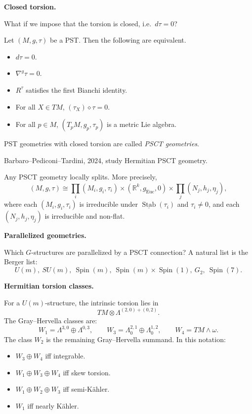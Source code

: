 \medskip\noindent
{\bf Closed torsion.}

What if we impose
that the torsion is closed,
i.e.\ $d\tau=0$?

\begin{lemma}
\label{lemma-let-m}
Let $(M,g,\tau)$ be a PST.
Then the following are equivalent.
\begin{itemize}
\item $d\tau=0$.
\item $\nabla^g\tau=0$.
\item $R^\tau$ satisfies the first
Bianchi identity.
\item For all $X\in TM$,
$(\tau_X)\diamond\tau=0$.
\item For all $p\in M$,
$(T_pM,g_p,\tau_p)$ is a
metric Lie algebra.
\end{itemize}
\end{lemma}

\begin{definition}
\label{definition-pst-geometries}
PST geometries with closed torsion are
called {\it PSCT geometries}.
\end{definition}

Barbaro--Pediconi--Tardini, 2024,
study Hermitian PSCT geometry.

\begin{theorem}
\label{theorem-any-psct}
Any PSCT geometry locally splits.
More precisely,
\[
(M,g,\tau)
\cong
\prod_i (M_i,g_i,\tau_i)
\times
(\mathbb{R}^k,g_{\mathrm{Euc}},0)
\times
\prod_j (N_j,h_j,\eta_j),
\]
where each $(M_i,g_i,\tau_i)$ is
irreducible under
$\underline{\operatorname{Stab}}(\tau_i)$
and $\tau_i\neq 0$,
and each $(N_j,h_j,\eta_j)$ is
irreducible and non-flat.
\end{theorem}

\medskip\noindent
{\bf Parallelized geometries.}

Which $G$-structures are parallelized
by a PSCT connection?
A natural list is the Berger list:
\[
U(m),\ SU(m),\ \operatorname{Spin}(m),
\ \operatorname{Spin}(m)\times
\operatorname{Spin}(1),
\ G_2,\ \operatorname{Spin}(7).
\]

\medskip\noindent
{\bf Hermitian torsion classes.}

For a $U(m)$-structure,
the intrinsic torsion lies in
\[
TM\otimes \Lambda^{(2,0)+(0,2)}.
\]
The Gray--Hervella classes are:
\[
W_1=
\Lambda^{3,0}\oplus\Lambda^{0,3},
\qquad
W_3=
\Lambda^{2,1}_0\oplus\Lambda^{1,2}_0,
\qquad
W_4=TM\wedge\omega.
\]
The class $W_2$ is the remaining
Gray--Hervella summand.
In this notation:
\begin{itemize}
\item $W_3\oplus W_4$ iff integrable.
\item $W_1\oplus W_3\oplus W_4$
iff skew torsion.
\item $W_1\oplus W_2\oplus W_3$
iff semi-K\"ahler.
\item $W_1$ iff nearly K\"ahler.
\end{itemize}

